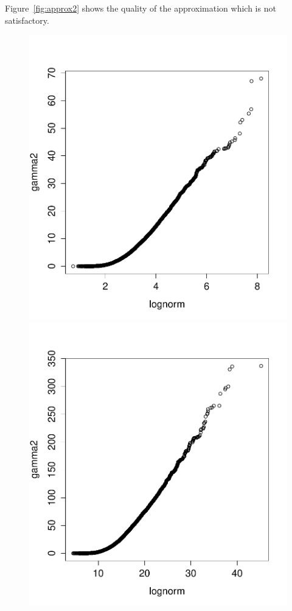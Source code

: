 \documentclass{article}
\begin{document}
Figure~\ref{fig:approx2} shows the quality of the approximation which is not satisfactory.

\begin{figure}[htb]
	\centering
	\begin{minipage}{.45\textwidth}
		\centering
		\includegraphics[width=0.97\linewidth]{bootstrap-filter/approx203.pdf}
	\end{minipage}
	\begin{minipage}{.45\textwidth}
		\centering
		\includegraphics[width=0.97\linewidth]{bootstrap-filter/approx2coeff5sigma03.pdf}

\end{minipage}
\end{figure}
\end{document}
